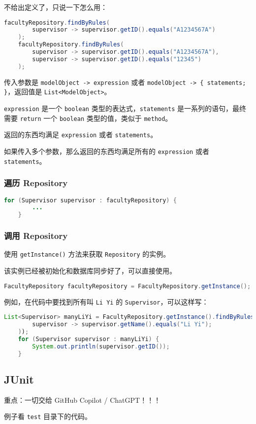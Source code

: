 \documentclass[hyperref,UTF8,12pt,a4paper]{ctexart}
\begin{document}
不给出定义了，只说一下怎么用：

\begin{lstlisting}[language=Java]
    facultyRepository.findByRules(
		supervisor -> supervisor.getID().equals("A1234567A")
	);
    facultyRepository.findByRules(
		supervisor -> supervisor.getID().equals("A1234567A"),
		supervisor -> supervisor.getID().equals("12345")
	);
\end{lstlisting}

传入参数是 \texttt{modelObject -> expression} 或者 \texttt{modelObject -> \{ statements; \}}，返回值是 \texttt{List<ModelObject>}。

\texttt{expression} 是一个 \texttt{boolean} 类型的表达式，\texttt{statements} 是一系列的语句，最终需要 \texttt{return} 一个 \texttt{boolean} 类型的值，类似于 \texttt{method}。

返回的东西均满足 \texttt{expression} 或者 \texttt{statements}。

如果传入多个参数，那么返回的东西均满足所有的 \texttt{expression} 或者 \texttt{statements}。

\subsubsection{遍历 Repository}

\begin{lstlisting}[language=Java]
	for (Supervisor supervisor : facultyRepository) {
		...
	}
\end{lstlisting}

\subsubsection{调用 Repository}

使用 \texttt{getInstance()} 方法来获取 \texttt{Repository} 的实例。

该实例已经被初始化和数据库同步好了，可以直接使用。

\begin{lstlisting}[language=Java]
	FacultyRepository facultyRepository = FacultyRepository.getInstance();
\end{lstlisting}

例如，在代码中要找到所有叫 \texttt{Li Yi} 的 \texttt{Supervisor}，可以这样写：

\begin{lstlisting}[language=Java]
	List<Supervisor> manyLiYi = FacultyRepository.getInstance().findByRules(
		supervisor -> supervisor.getName().equals("Li Yi");
	));
	for (Supervisor supervisor : manyLiYi) {
		System.out.println(supervisor.getID());
	}
\end{lstlisting}

\subsection{JUnit}

重点：一切交给 GitHub Copilot / ChatGPT！！！

例子看 \texttt{test} 目录下的代码。
\end{document}
